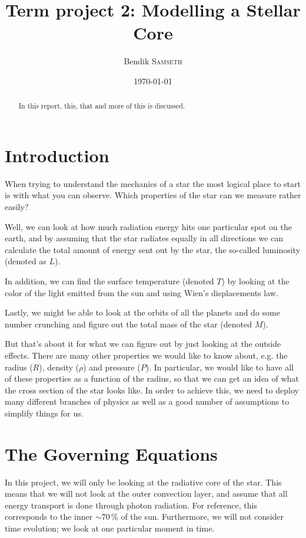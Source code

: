 \documentclass[11pt]{article}
\title{Term project 2: Modelling a Stellar Core}
\author{Bendik \textsc{Samseth}}
\date{\today}
\begin{document}
\maketitle


\begin{abstract}
In this report, this, that and more of this is discussed.
\end{abstract}

\section{Introduction}
When trying to understand the mechanics of a star the most logical
place to start is with what you can observe. Which properties of the
star can we measure rather easily? 

Well, we  can look at how much
radiation energy hits one particular spot on the earth, and by
assuming that the star radiates equally in all directions we can
calculate the total amount of energy sent out by the star, the
so-called luminosity (denoted as $L$). 

In addition, we can find the surface temperature (denoted $T$) by
looking at the color of the light emitted from the sun and using
Wien's displacements law. 

Lastly, we might be able to look at the orbits of all the planets and
do some number crunching and figure out the total mass of the star (denoted $M$).

But that's about it for what we can figure out by just looking at the
outside effects. There are many other properties we would like to know
about, e.g. the radius ($R$), density ($\rho$) and pressure ($P$). In
particular, we would like to have all of these properties as a
function of the radius, so that we can get an idea of what the cross
section of the star looks like. In order to achieve this, we need to
deploy many different branches of physics as well as a good number of
assumptions to simplify things for us. 


\section{The Governing Equations}
In this project, we will only be looking at the radiative core of the
star. This means that we will not look at the outer convection layer,
and assume that all energy transport is done through photon
radiation. For reference, this corresponds to the inner $\sim 70\,\%$ of the
sun. Furthermore, we will not consider time evolution; we look at one
particular moment in time. 
\end{document}
